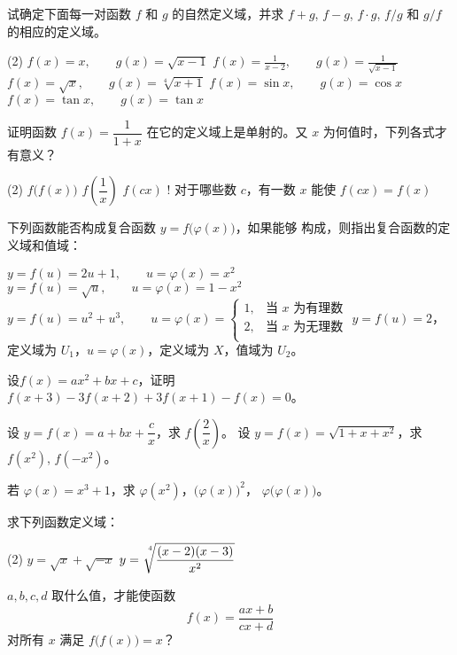 \begin{Exercise}

\begin{question}
  \item 试确定下面每一对函数 $f$ 和 $g$ 的自然定义域，并求 $f+g$, $f-g$, $f\cdot g$, $f/g$ 和 $g/f$ 的相应的定义域。
  \begin{tasks}(2)
    \task $f(x)=x,\qquad g(x)=\sqrt{x-1}$
    \task $f(x)=\frac{1}{x-2},\qquad g(x)=\frac{1}{\sqrt{x-1}}$
    \task $f(x)=\sqrt{x},\qquad g(x)=\sqrt[4]{x+1}$
    \task $f(x)=\sin x,\qquad g(x)=\cos x$
    \task $f(x)=\tan x,\qquad g(x)=\tan x$
  \end{tasks}
    \item 证明函数 $f(x)=\dfrac{1}{1+x}$ 在它的定义域上是单射的。又 $x$ 为何值时，下列各式才有意义？
\begin{tasks}(2)
    \task $f\big(f(x)\big)$
    \task $f\left(\dfrac{1}{x}\right)$
    \task $f(cx)$
    \task! 对于哪些数 $c$，有一数 $x$ 能使 $f(cx)=f(x)$
\end{tasks}        

\item 下列函数能否构成复合函数 $y=f\big(\varphi(x)\big)$，如果能够
构成，则指出复合函数的定义域和值域：
\begin{tasks}
    \task $y=f(u)=2u+1,\qquad u=\varphi(x)=x^2$
    \task $y=f(u)=\sqrt{u},\qquad u=\varphi(x)=1-x^2$
    \task $y=f(u)=u^2+u^3, \qquad u=\varphi(x)=\begin{cases}
        1,& \text{当 $x$ 为有理数}\\
        2,&\text{当 $x$ 为无理数}\\
    \end{cases}$
    \task $y=f(u)=2$，定义域为 $U_1$，\qquad  $u=\varphi(x)$，定义域为 $X$，值域为 $U_2$。
\end{tasks}

\item 设$f(x)=ax^2+bx+c$，证明
$f(x+3)-3f(x+2)+3f(x+1)-f(x)=0$。
\item 
\begin{tasks}
\task 设 $y=f(x)=a+bx+\dfrac{c}{x}$，求 $f\left(\dfrac{2}{x}\right)$。
\task 设 $y=f(x)=\sqrt{1+x+x^2}$，求 $f(x^2)$, $f(-x^2)$。
\end{tasks}

\item 若 $\varphi(x)=x^3+1$，求 $\varphi(x^2)$，$\big(\varphi(x)\big)^2$， $\varphi\big(\varphi(x)\big)$。
\item 求下列函数定义域：
 \begin{tasks}(2)
    \task $y=\sqrt{x}+\sqrt{-x}$
    \task $y=\sqrt[\uproot{10}\leftroot{-3}4]{\dfrac{(x-2)(x-3)}{x^2}}$
\end{tasks}   

\item $a,b,c,d$ 取什么值，才能使函数
\[f(x)=\frac{ax+b}{cx+d}\]
对所有 $x$ 满足 $f\big(f(x)\big)=x$？
\end{question}
\end{Exercise}

